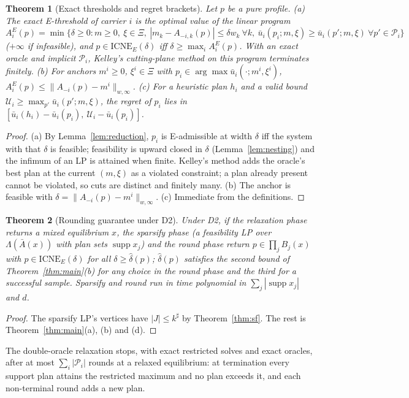 \documentclass[preprint,11pt]{elsarticle}
\newtheorem{theorem}{Theorem}
\theoremstyle{definition}
\theoremstyle{remark}
\newcommand{\cP}{\mathcal{P}}
\newcommand{\ub}{\bar u}
\newcommand{\Abar}{\bar A}
\newcommand{\supp}{\operatorname{supp}}
\newcommand{\ICNE}{\mathrm{ICNE}}
\begin{document}
\begin{theorem}[Exact thresholds and regret brackets]\label{thm:cert}
Let $p$ be a pure profile. (a) The exact E-threshold of carrier $i$ is the optimal value of the linear program
$A_i^E(p)=\min\{\delta\ge0: m\ge0,\ \xi\in\Xi,\ |m_k-A_{-i,k}(p)|\le\delta w_k\ \forall k,\ \ub_i(p_i;m,\xi)\ge\ub_i(p';m,\xi)\ \forall p'\in\cP_i\}$ ($+\infty$ if infeasible), and $p\in\ICNE_E(\delta)$ iff $\delta\ge\max_iA^E_i(p)$. With an exact oracle and implicit $\cP_i$, Kelley's cutting-plane method on this program terminates finitely. (b) For anchors $m^i\ge0$, $\xi^i\in\Xi$ with $p_i\in\arg\max\ub_i(\cdot;m^i,\xi^i)$, $A_i^E(p)\le\|A_{-i}(p)-m^i\|_{w,\infty}$. (c) For a heuristic plan $h_i$ and a valid bound $\mathcal U_i\ge\max_{p'}\ub_i(p';m,\xi)$, the regret of $p_i$ lies in $[\ub_i(h_i)-\ub_i(p_i),\ \mathcal U_i-\ub_i(p_i)]$.
\end{theorem}
\begin{proof}
(a) By Lemma~\ref{lem:reduction}, $p_i$ is E-admissible at width $\delta$ iff the system with that $\delta$ is feasible; feasibility is upward closed in $\delta$ (Lemma~\ref{lem:nesting}) and the infimum of an LP is attained when finite. Kelley's method adds the oracle's best plan at the current $(m,\xi)$ as a violated constraint; a plan already present cannot be violated, so cuts are distinct and finitely many. (b) The anchor is feasible with $\delta=\|A_{-i}(p)-m^i\|_{w,\infty}$. (c) Immediate from the definitions.
\end{proof}

\begin{theorem}[Rounding guarantee under D2]\label{thm:D2}
Under D2, if the relaxation phase returns a mixed equilibrium $x$, the sparsify phase (a feasibility LP over $\Lambda(\Abar(x))$ with plan sets $\supp x_j$) and the round phase return $p\in\prod_jB_j(x)$ with $p\in\ICNE_E(\delta)$ for all $\delta\ge\hat\delta(p)$; $\hat\delta(p)$ satisfies the second bound of Theorem~\ref{thm:main}(b) for any choice in the round phase and the third for a successful sample. Sparsify and round run in time polynomial in $\sum_j|\supp x_j|$ and $d$.
\end{theorem}
\begin{proof}
The sparsify LP's vertices have $|J|\le k^\sharp$ by Theorem~\ref{thm:sf}. The rest is Theorem~\ref{thm:main}(a), (b) and (d).
\end{proof}

The double-oracle relaxation \citep{McMahan2003} stops, with exact restricted solves and exact oracles, after at most $\sum_i|\cP_i|$ rounds at a relaxed equilibrium: at termination every support plan attains the restricted maximum and no plan exceeds it, and each non-terminal round adds a new plan.
\end{document}
